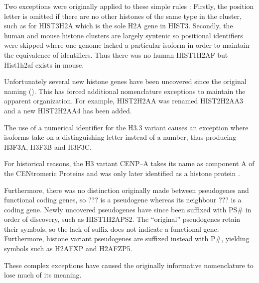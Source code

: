     Two exceptions were originally applied to these simple rules \citep{Marzluff02}: 
	Firstly, the position letter is omitted if there are no other histones of the same type in the cluster, 
	such as for HIST3H2A which is the sole H2A gene in HIST3. 
	Secondly, the human and mouse histone clusters are largely syntenic 
	so positional identifiers were skipped where one genome lacked a particular isoform 
	in order to maintain the equivalence of identifiers. 
	Thus there was no human HIST1H2AF but Hist1h2af exists in mouse.

	Unfortunately several new histone genes have been uncovered since the original naming (). 
	This has forced additional nomenclature exceptions to maintain the apparent organization.
	For example, HIST2H2AA was renamed HIST2H2AA3 and a new HIST2H2AA4 has been added.
	
	The use of a numerical identifier for the H3.3 variant causes an exception 
	where isoforms take on a distinguishing letter instead of a number, 
	thus producing H3F3A, H3F3B and H3F3C.
	
	For historical reasons, the H3 variant CENP--A takes its name as 
	component A of the CENtromeric Proteins \cite{CENPA-first-report} 
	and was only later identified as a histone protein \citep{CENPA-copurifies-histones, CENPA-sequence-analysis}.
	
	Furthermore, there was no distinction originally made between pseudogenes and functional coding genes, 
	so ??? is a pseudogene whereas its neighbour ??? is a coding gene.
	Newly uncovered pseudogenes have since been suffixed with PS\# in order of discovery, such as HIST1H2APS2. 
	The ``original'' pseudogenes retain their symbols, so the lack of suffix does not indicate a functional gene.
	Furthermore, histone variant pseudogenes are suffixed instead with P\#, yielding symbols such as H2AFXP and H2AFZP5.

    These complex exceptions have caused the originally informative nomenclature to lose much of its meaning. 


